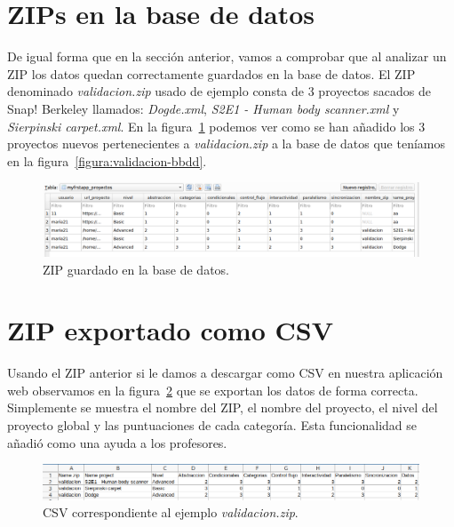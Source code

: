 \documentclass[a4paper, 12pt]{book}
\begin{document}
\section{ZIPs en la base de datos}
De igual forma que en la sección anterior, vamos a comprobar que al analizar un ZIP los datos quedan correctamente guardados en la base de datos. El ZIP denominado \textit{validacion.zip} usado de ejemplo  consta de 3 proyectos sacados de Snap! Berkeley llamados: \textit{Dogde.xml},     \textit{ S2E1 - Human body scanner.xml} y \textit{Sierpinski carpet.xml}. En la figura~\ref{figura:bbdd-zip} podemos ver como se han añadido los 3 proyectos nuevos pertenecientes a \textit{validacion.zip} a la base de datos que teníamos en la figura~\ref{figura:validacion-bbdd}.
\begin{figure}[h]
            \centering
            \includegraphics[scale=0.37]{img/bbdd-zip.png}
            \caption{ZIP guardado en la base de datos.}
             \label{figura:bbdd-zip}
        \end{figure}
\section{ZIP exportado como CSV}
Usando el ZIP anterior si le damos a descargar como CSV en nuestra aplicación web observamos en la figura~\ref{figura:csv} que se exportan los datos de forma correcta. Simplemente se muestra el nombre del ZIP, el nombre del proyecto, el nivel del proyecto global y las puntuaciones de cada categoría. Esta funcionalidad se añadió como una ayuda a los profesores.
\begin{figure}[h]
            \centering
           \includegraphics[scale=0.5]{img/csv.png}
            \caption{CSV correspondiente al ejemplo \textit{validacion.zip}.}
             \label{figura:csv}
        \end{figure}
\end{document}
